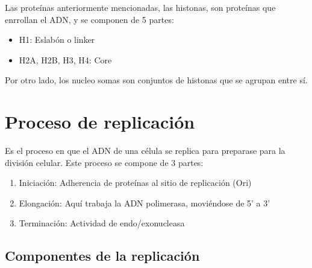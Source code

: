 Las proteínas anteriormente mencionadas, las histonas, son proteínas que enrrollan el ADN, y se componen de 5 partes:

\begin{itemize}
    \item H1: Eslabón o linker
    \item H2A, H2B, H3, H4: Core
\end{itemize}

Por otro lado, los nucleo somas son conjuntos de histonas que se agrupan entre sí.

\section{Proceso de replicación}

Es el proceso en que el ADN de una célula se replica para preparase para la división celular. Este proceso se compone de 3 partes:

\begin{enumerate}
    \item Iniciación: Adherencia de proteínas al sitio de replicación (Ori)
    \item Elongación: Aquí trabaja la ADN polimerasa, moviéndose de 5' a 3'
    \item Terminación: Actividad de endo/exonucleasa
\end{enumerate}

\subsection{Componentes de la replicación}

